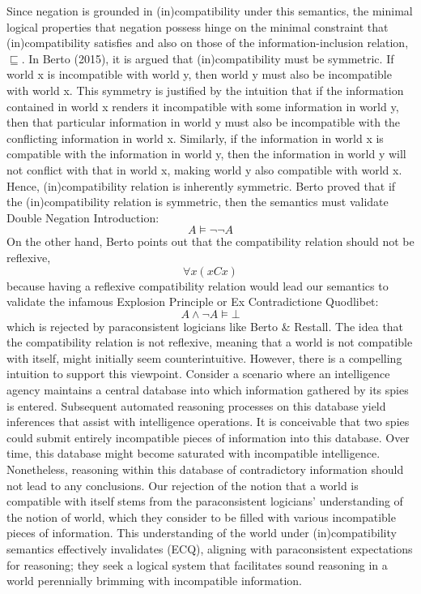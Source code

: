 Since negation is grounded in (in)compatibility under this semantics, the minimal logical properties that negation possess hinge on the minimal constraint that (in)compatibility satisfies and also on those of the information-inclusion relation, $\sqsubseteq$. In Berto (2015), it is argued that (in)compatibility must be symmetric. If world x is incompatible with world y, then world y must also be incompatible with world x. This symmetry is justified by the intuition that if the information contained in world x renders it incompatible with some information in world y, then that particular information in world y must also be incompatible with the conflicting information in world x. Similarly, if the information in world x is compatible with the information in world y, then the information in world y will not conflict with that in world x, making world y also compatible with world x. Hence, (in)compatibility relation is inherently symmetric. Berto proved that if the (in)compatibility relation is symmetric, then the semantics must validate Double Negation Introduction:
\begin{equation}
    A \vDash \neg\neg A \tag{DNI}
\end{equation}
On the other hand, Berto points out that the compatibility relation should not be reflexive,
\begin{equation}
    \forall x (xCx) \tag{Reflexivity}
\end{equation}
because having a reflexive compatibility relation would lead our semantics to validate the infamous Explosion Principle or Ex Contradictione Quodlibet:
\begin{equation}
    A \land \neg A \vDash \bot \tag{ECQ}
\end{equation}
which is rejected by paraconsistent logicians like Berto \& Restall. The idea that the compatibility relation is not reflexive, meaning that a world is not compatible with itself, might initially seem counterintuitive. However, there is a compelling intuition to support this viewpoint. Consider a scenario where an intelligence agency maintains a central database into which information gathered by its spies is entered. Subsequent automated reasoning processes on this database yield inferences that assist with intelligence operations. It is conceivable that two spies could submit entirely incompatible pieces of information into this database. Over time, this database might become saturated with incompatible intelligence. Nonetheless, reasoning within this database of contradictory information should not lead to any conclusions. Our rejection of the notion that a world is compatible with itself stems from the paraconsistent logicians' understanding of the notion of world, which they consider to be filled with various incompatible pieces of information. This understanding of the world under (in)compatibility semantics effectively invalidates (ECQ), aligning with paraconsistent expectations for reasoning; they seek a logical system that facilitates sound reasoning in a world perennially brimming with incompatible information.


